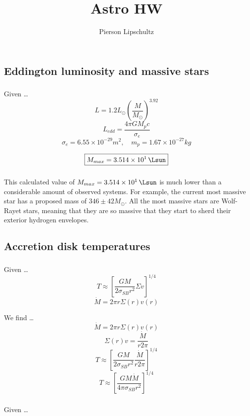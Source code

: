 \documentclass{article}
\title{Astro HW \hwNUM}
\author{Pierson Lipschultz}
\def\hwNUM{12}
\begin{document}
\maketitle
\setcounter{section}{\hwNUM}

\subsection{Eddington luminosity and massive stars}

\subsubsection{}
Given \dots
\[L = 1.2 L_\odot \left(\frac{M}{M_\odot}\right)^{3.92}\]
\[L_{edd} = \frac{4\pi GM_p c}{\sigma_e}\]
\[\sigma_e = 6.55 \times 10^{-29} m^2, \quad m_p = 1.67 \times 10 ^{-27}kg\]


\[\boxed{M_{max} = \SI{3.514e+01}{\Lsun}}\]


\subsubsection{}
This calculated value of \({M_{max} = \SI{3.514e+01}{\Lsun}}\) is much lower than a considerable amount of observed systems. For example, the current most massive star has a proposed mass of \(346\pm42 M_\odot\)\cite{Keszthelyi_2025}. All the most massive stars are Wolf-Rayet stars, meaning that they are so massive that they start to sherd their exterior hydrogen envelopes.

\subsection{Accretion disk temperatures}
\subsubsection{}
Given \dots 
\[T \approx \left[\frac{GM}{2\sigma_{SB}r^2 }\Sigma v\right]^{1/4}\]
\[\dot{M} = 2\pi r\Sigma(r)v(r)\]

We find \dots 
\[\dot{M} = 2\pi r\Sigma(r)v(r)\]
\[\Sigma(r)v = \frac{\dot{M}}{r2\pi}\]
\[T \approx \left[\frac{GM}{2\sigma_{SB}r^2 }\frac{\dot{M}}{r2\pi}\right]^{1/4}\]
\[T \approx \left[\frac{GM\dot{M}}{4\pi\sigma_{SB}r^2 }\right]^{1/4}\]


\subsubsection{}
Given \dots 
\end{document}

